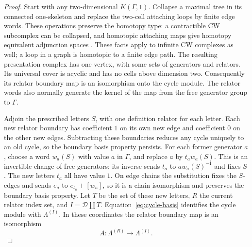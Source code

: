 \begin{proof}
Start with any two-dimensional $K(\Gamma,1)$.  Collapse a maximal tree
in its connected one-skeleton and replace the two-cell attaching loops
by finite edge words.  These operations preserve the homotopy type:
a contractible CW subcomplex can be collapsed, and homotopic attaching
maps give homotopy equivalent adjunction spaces
\cite[Propositions~0.17 and~0.18]{Hatcher2002}.  These facts apply to
infinite CW complexes as well; a loop in a graph is homotopic to a finite
edge path.  The resulting presentation complex has one vertex, with
some sets of generators and relators.  Its universal cover is acyclic
and has no cells above dimension two.  Consequently its relator boundary
map is an isomorphism onto the cycle module.  The relator words also
normally generate the kernel of the map from the free generator group
to $\Gamma$.

Adjoin the prescribed letters $S$, with one definition relator for each
letter.  Each new relator boundary has coefficient $1$ on its own new
edge and coefficient $0$ on the other new edges.  Subtracting these
boundaries reduces any cycle uniquely to an old cycle, so the boundary
basis property persists.  For each former generator $a$, choose a word
$w_a(S)$ with value $a$ in $\Gamma$, and replace $a$ by $t_a w_a(S)$.
This is an invertible change of free generators: its inverse sends
$t_a$ to $a w_a(S)^{-1}$ and fixes $S$.  The new letters $t_a$ all have
value $1$.  On edge chains the substitution fixes the $S$-edges and
sends $e_a$ to $e_{t_a}+[w_a]$, so it is a chain isomorphism and preserves
the boundary basis property.  Let $T$ be the set of these new letters,
$R$ the current relator index set, and $I=\mathcal D\amalg T$.
Equation~\eqref{eq:cycle-basis} identifies the cycle module with
$\Lambda^{(I)}$.  In these coordinates the relator boundary map is an
isomorphism
\[
 A:\Lambda^{(R)}\longrightarrow\Lambda^{(I)}.
\]


\end{proof}
